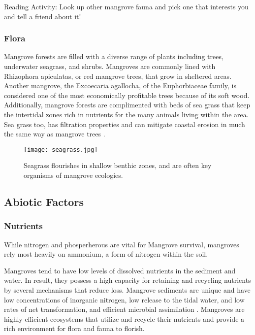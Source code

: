 Reading Activity: Look up other mangrove fauna and pick one that interests you and tell a friend about it!  

\subsubsection{Flora}

Mangrove forests are filled with a diverse range of plants including trees, underwater seagrass, and shrubs. Mangroves are commonly lined with Rhizophora apiculatas, or red mangrove trees, that grow in sheltered areas. Another mangrove, the Excoecaria agallocha, of the Euphorbiaceae family, is considered one of the most  economically profitable trees because of its soft wood. Additionally, mangrove forests are complimented with beds of sea grass that keep the intertidal zones rich in nutrients for the many animals living within the area. Sea grass too, has filtration properties and can mitigate coastal erosion in much the same way as mangrove trees \citep{hoegh1999climate}. 

\begin{figure}[!h]
    \centering
    \texttt{[image: seagrass.jpg]}
    \caption {Seagrass flourishes in shallow benthic zones, and are often key organisms of mangrove ecologies.}
    \label{fig:seagrass}
\end{figure}


\subsection{Abiotic Factors}

\subsubsection{Nutrients}
While nitrogen and phosperherous are vital for Mangrove survival, mangroves rely most heavily on ammonium, a form of nitrogen within the soil. 

Mangroves tend to have low levels of dissolved nutrients in the sediment and water. In result, they possess a high capacity for retaining and recycling nutrients by several mechanisms that reduce loss. Mangrove sediments are unique and have low concentrations of inorganic nitrogen, low release to the tidal water, and low rates of net transformation, and efficient microbial assimilation \citep{kristensen2000carbon}. Mangroves are highly efficient ecosystems that utilize and recycle their nutrients and provide a rich environment for flora and fauna to florish. 



